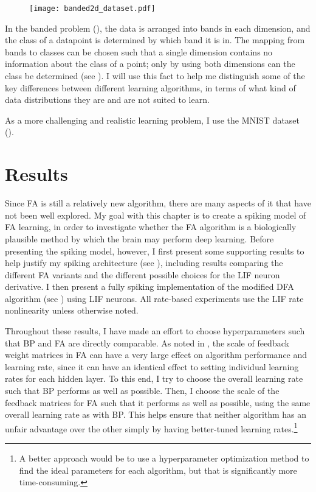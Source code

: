 \begin{figure}
  \centering
  \texttt{[image: banded2d\_dataset.pdf]}
\end{figure}

In the banded problem (),
the data is arranged into bands in each dimension,
and the class of a datapoint is determined by which band it is in.
The mapping from bands to classes can be chosen such that
a single dimension contains no information about the class of a point;
only by using both dimensions can the class be determined (see ).
I will use this fact to help me distinguish some of the key differences
between different learning algorithms,
in terms of what kind of data distributions they are and are not suited to learn.

As a more challenging and realistic learning problem,
I use the MNIST dataset ().


\section{Results}

Since FA is still a relatively new algorithm,
there are many aspects of it that have not been well explored.
My goal with this chapter is to create a spiking model of FA learning,
in order to investigate whether the FA algorithm is a biologically plausible method
by which the brain may perform deep learning.
Before presenting the spiking model, however,
I first present some supporting results
to help justify my spiking architecture (see ),
including results comparing the different FA variants
and the different possible choices for the LIF neuron derivative.
I then present a fully spiking implementation
of the modified DFA algorithm (see )
using LIF neurons.
All rate-based experiments use the LIF rate nonlinearity
unless otherwise noted.

Throughout these results, I have made an effort to choose hyperparameters
such that BP and FA are directly comparable.
As noted in ,
the scale of feedback weight matrices in FA can have
a very large effect on algorithm performance and learning rate,
since it can have an identical effect to setting individual learning rates
for each hidden layer.
To this end, I try to choose the overall learning rate
such that BP performs as well as possible.
Then, I choose the scale of the feedback matrices for FA
such that it performs as well as possible,
using the same overall learning rate as with BP.
This helps ensure that neither algorithm has an unfair advantage over the other
simply by having better-tuned learning rates.\footnote{
A better approach would be to use a hyperparameter optimization method
to find the ideal parameters for each algorithm,
but that is significantly more time-consuming.}


